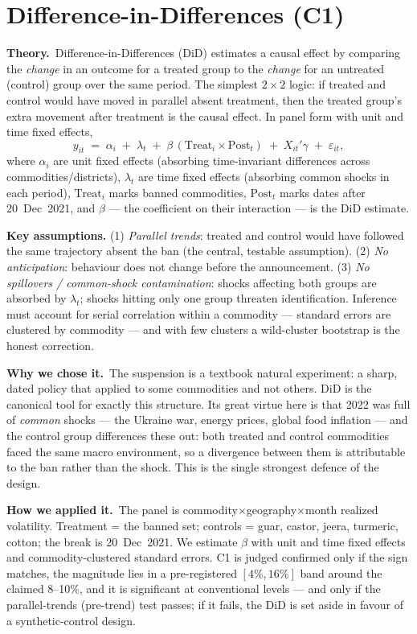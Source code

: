 \documentclass[11pt]{article}
\newcommand{\why}{\smallskip\noindent\textbf{Why we chose it.}\ }
\newcommand{\how}{\smallskip\noindent\textbf{How we applied it.}\ }
\newcommand{\thy}{\noindent\textbf{Theory.}\ }
\begin{document}
\section{Difference-in-Differences (C1)}
\thy Difference-in-Differences (DiD) estimates a causal effect by comparing the
\emph{change} in an outcome for a treated group to the \emph{change} for an untreated
(control) group over the same period. The simplest $2\times2$ logic: if treated and control
would have moved in parallel absent treatment, then the treated group's extra movement after
treatment is the causal effect. In panel form with unit and time fixed effects,
\[
  y_{it} \;=\; \alpha_i \;+\; \lambda_t \;+\; \beta\,(\mathrm{Treat}_i \times \mathrm{Post}_t)
  \;+\; X_{it}'\gamma \;+\; \varepsilon_{it},
\]
where $\alpha_i$ are unit fixed effects (absorbing time-invariant differences across
commodities/districts), $\lambda_t$ are time fixed effects (absorbing common shocks in each
period), $\mathrm{Treat}_i$ marks banned commodities, $\mathrm{Post}_t$ marks dates after
20~Dec~2021, and $\beta$ --- the coefficient on their interaction --- is the DiD estimate.

\smallskip\noindent\textbf{Key assumptions.} (1) \emph{Parallel trends}: treated and control
would have followed the same trajectory absent the ban (the central, testable assumption).
(2) \emph{No anticipation}: behaviour does not change before the announcement. (3) \emph{No
spillovers / common-shock contamination}: shocks affecting both groups are absorbed by
$\lambda_t$; shocks hitting only one group threaten identification. Inference must account
for serial correlation within a commodity --- standard errors are clustered by commodity ---
and with few clusters a wild-cluster bootstrap is the honest correction.

\why The suspension is a textbook natural experiment: a sharp, dated policy that applied to
some commodities and not others. DiD is the canonical tool for exactly this structure. Its
great virtue here is that 2022 was full of \emph{common} shocks --- the Ukraine war, energy
prices, global food inflation --- and the control group differences these out: both treated
and control commodities faced the same macro environment, so a divergence between them is
attributable to the ban rather than the shock. This is the single strongest defence of the
design.

\how The panel is commodity$\times$geography$\times$month realized volatility. Treatment =
the banned set; controls = guar, castor, jeera, turmeric, cotton; the break is
20~Dec~2021. We estimate $\beta$ with unit and time fixed effects and commodity-clustered
standard errors. C1 is judged confirmed only if the sign matches, the magnitude lies in a
pre-registered $[4\%,16\%]$ band around the claimed 8--10\%, and it is significant at
conventional levels --- and only if the parallel-trends (pre-trend) test passes; if it
fails, the DiD is set aside in favour of a synthetic-control design.
\end{document}
